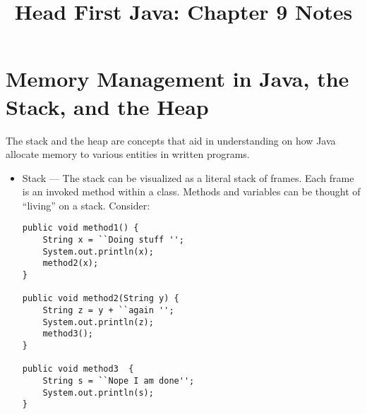 \documentclass{tufte-handout}
\title{Head First Java: Chapter 9 Notes}
\begin{document}
    \maketitle

    \section*{Memory Management in Java, the Stack, and the Heap}
    The stack and the heap are concepts that aid in understanding on how Java allocate memory to various entities in written programs. 

    \begin{itemize}
        \item Stack --- The stack can be visualized as a literal stack of frames. Each frame is an invoked method within a class. Methods and variables can be thought of ``living'' on a stack. Consider:

        \begin{lstlisting}
public void method1() {
    String x = ``Doing stuff '';
    System.out.println(x);
    method2(x);
} 

public void method2(String y) {
    String z = y + ``again '';
    System.out.println(z);
    method3();
}

public void method3  {
    String s = ``Nope I am done'';
    System.out.println(s);
}
        \end{lstlisting}


\end{itemize}
\end{document}
